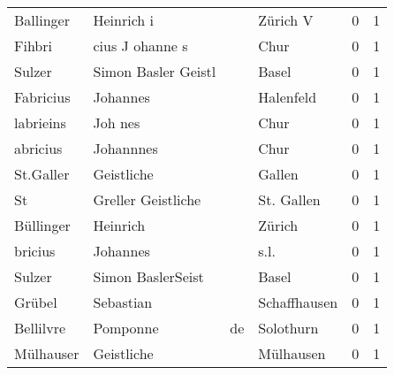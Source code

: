 \begin{tabular}{llllrr}
                Ballinger &                         Heinrich i &             &                                    Zürich V &          0 &         1 \\
                   Fihbri &                    cius J ohanne s &             &                                        Chur &          0 &         1 \\
                   Sulzer &                Simon Basler Geistl &             &                                       Basel &          0 &         1 \\
                Fabricius &                           Johannes &             &                                   Halenfeld &          0 &         1 \\
                labrieins &                            Joh nes &             &                                        Chur &          0 &         1 \\
                 abricius &                          Johannnes &             &                                        Chur &          0 &         1 \\
                St.Galler &                         Geistliche &             &                                      Gallen &          0 &         1 \\
                       St &                 Greller Geistliche &             &                                  St. Gallen &          0 &         1 \\
                Büllinger &                           Heinrich &             &                                      Zürich &          0 &         1 \\
                  bricius &                           Johannes &             &                                        s.l. &          0 &         1 \\
                   Sulzer &                  Simon BaslerSeist &             &                                       Basel &          0 &         1 \\
                   Grübel &                          Sebastian &             &                                Schaffhausen &          0 &         1 \\
                Bellilvre &                           Pomponne &          de &                                   Solothurn &          0 &         1 \\
                Mülhauser &                         Geistliche &             &                                   Mülhausen &          0 &         1 \\

\end{tabular}

